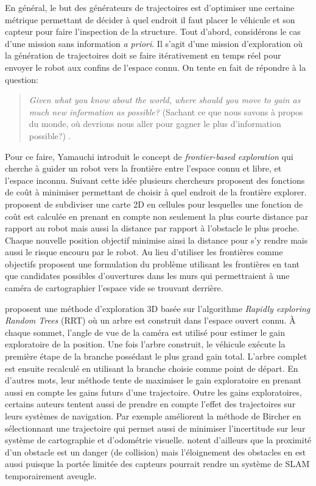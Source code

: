 En général, le but des générateurs de trajectoires est d'optimiser une certaine métrique permettant de décider à quel endroit il faut placer le véhicule et son capteur pour faire l'inspection de la structure. Tout d'abord, considérons le cas d'une mission sans information \textit{a priori}. Il s'agit d'une mission d'exploration où la génération de trajectoires doit se faire itérativement en temps réel pour envoyer le robot aux confins de l'espace connu. On tente en fait de répondre à la question:

\begin{quote}
  \emph{Given what you know about the world, where should you move to gain as much new information as possible?} (Sachant ce que nous savons à propos du monde, où devrions nous aller pour gagner le plus d'information possible?) \citep{Yamauchi1997}.
\end{quote}

Pour ce faire, Yamauchi introduit le concept de \textit{frontier-based exploration} qui cherche à guider un robot vers la frontière entre l'espace connu et libre, et l'espace inconnu. Suivant cette idée plusieurs chercheurs proposent des fonctions de coût à minimiser permettant de choisir à quel endroit de la frontière explorer. \cite{Wirth2007} proposent de subdiviser une carte 2D en cellules pour lesquelles une fonction de coût est calculée en prenant en compte non seulement la plus courte distance par rapport au robot mais aussi la distance par rapport à l'obstacle le plus proche. Chaque nouvelle position objectif minimise ainsi la distance pour s'y rendre mais aussi le risque encouru par le robot. Au lieu d'utiliser les frontières comme objectifs \cite{Dornhege2011} proposent une formulation du problème utilisant les frontières en tant que candidates possibles d'ouvertures dans les murs qui permettraient à une caméra de cartographier l'espace vide se trouvant derrière.

\cite{Bircher2016} proposent une méthode d'exploration 3D basée sur l'algorithme \textit{Rapidly exploring Random Trees} (RRT) où un arbre est construit dans l'espace ouvert connu. À chaque sommet, l'angle de vue de la caméra est utilisé pour estimer le gain exploratoire de la position. Une fois l'arbre construit, le véhicule exécute la première étape de la branche possédant le plus grand gain total. L'arbre complet est ensuite recalculé en utilisant la branche choisie comme point de départ. En d'autres mots, leur méthode tente de maximiser le gain exploratoire en prenant aussi en compte les gains futurs d'une trajectoire. Outre les gains exploratoires, certains auteurs tentent aussi de prendre en compte l'effet des trajectoires sur leurs systèmes de navigation. Par exemple \cite{Papachristos2017} améliorent la méthode de Bircher en sélectionnant une trajectoire qui permet aussi de minimiser l'incertitude sur leur système de cartographie et d'odométrie visuelle. \cite{Wirth2007} notent d'ailleurs que la proximité d'un obstacle est un danger (de collision) mais l'éloignement des obstacles en est aussi puisque la portée limitée des capteurs pourrait rendre un système de SLAM temporairement aveugle.

